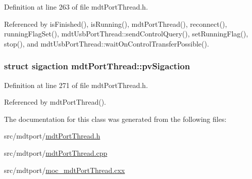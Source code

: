 Definition at line 263 of file mdt\-Port\-Thread.\-h.



Referenced by is\-Finished(), is\-Running(), mdt\-Port\-Thread(), reconnect(), running\-Flag\-Set(), mdt\-Usb\-Port\-Thread\-::send\-Control\-Query(), set\-Running\-Flag(), stop(), and mdt\-Usb\-Port\-Thread\-::wait\-On\-Control\-Transfer\-Possible().

\hypertarget{classmdt_port_thread_ae22f83fd56b06cdaa9b77abafe85a6b4}{
\subsubsection[{pv\-Sigaction}]{\setlength{\rightskip}{0pt plus 5cm}struct sigaction mdt\-Port\-Thread\-::pv\-Sigaction\hspace{0.3cm}{\ttfamily [protected]}}}\label{classmdt_port_thread_ae22f83fd56b06cdaa9b77abafe85a6b4}


Definition at line 271 of file mdt\-Port\-Thread.\-h.



Referenced by mdt\-Port\-Thread().



The documentation for this class was generated from the following files\-:\begin{DoxyCompactItemize}
\item 
src/mdtport/\hyperlink{mdt_port_thread_8h}{mdt\-Port\-Thread.\-h}\item 
src/mdtport/\hyperlink{mdt_port_thread_8cpp}{mdt\-Port\-Thread.\-cpp}\item 
src/mdtport/\hyperlink{moc__mdt_port_thread_8cxx}{moc\-\_\-mdt\-Port\-Thread.\-cxx}\end{DoxyCompactItemize}
